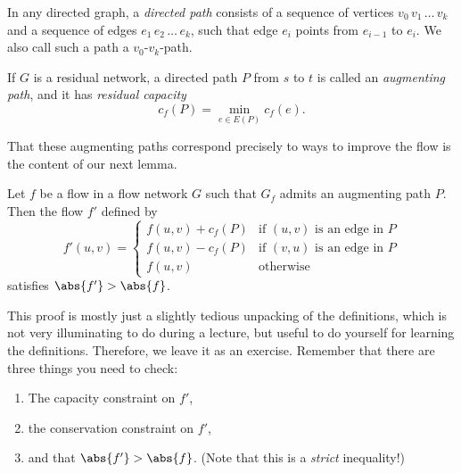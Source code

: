 \documentclass[nobib]{tufte-handout}
\begin{document}
\begin{definition}
    In any directed graph, a \emph{directed path} consists of a sequence of vertices $v_0\, v_1\, \ldots\, v_k$ and a sequence of edges $e_1\, e_2\, \ldots\, e_k$, such that edge $e_i$ points from $e_{i-1}$ to $e_i$. We also call such a path a $v_0$-$v_k$-path.

    If $G$ is a residual network, a directed path $P$ from $s$ to $t$ is called an \emph{augmenting path}, and it has \emph{residual capacity}
    $$c_f(P) = \min_{e\in E(P)} c_f(e).$$
\end{definition}

That these augmenting paths correspond precisely to ways to improve the flow is the content of our next lemma.

\begin{lemma}\label{lemma:can_augment_flows}
    Let $f$ be a flow in a flow network $G$ such that $G_f$ admits an augmenting path $P$. Then the flow $f'$ defined by
    $$f'(u,v) = \begin{cases}
        f(u,v) + c_f(P)&\text{if }(u,v)\text{ is an edge in }P\\
        f(u,v) - c_f(P)&\text{if }(v,u)\text{ is an edge in }P\\
        f(u,v)&\text{otherwise}
    \end{cases}$$
    satisfies $\abs{f'} > \abs{f}$.

    \begin{xca}
        This proof is mostly just a slightly tedious unpacking of the definitions, which is not very illuminating to do during a lecture, but useful to do yourself for learning the definitions. Therefore, we leave it as an exercise. Remember that there are three things you need to check:
        \begin{enumerate}
            \item The capacity constraint on $f'$,
            \item the conservation constraint on $f'$,
            \item and that $\abs{f'} > \abs{f}$. (Note that this is a \emph{strict} inequality!)
        \end{enumerate}
    \end{xca}
\end{lemma}
\end{document}
